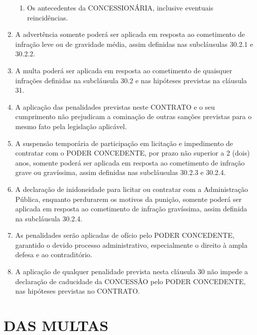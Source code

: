 \documentclass[a4paper,11pt]{report} %
\begin{document}
\begin{enumerate}
\begin{enumerate}[label*=\arabic*.]
\item \label{itm:CPNZ} Os antecedentes da CONCESSIONÁRIA, inclusive eventuais reincidências.
\end{enumerate}

\item \label{itm:F7F3} A advertência somente poderá ser aplicada em resposta ao cometimento de infração leve ou de gravidade média, assim definidas nas subcláusulas 30.2.1 e 30.2.2.

\item \label{itm:M4G4} A multa poderá ser aplicada em resposta ao cometimento de quaisquer infrações definidas na subcláusula 30.2 e nas hipóteses previstas na cláusula 31.

\item \label{itm:PTRL} A aplicação das penalidades previstas neste CONTRATO e o seu cumprimento não prejudicam a cominação de outras sanções previstas para o mesmo fato pela legislação aplicável.

\item \label{itm:AXZA} A suspensão temporária de participação em licitação e impedimento de contratar com o PODER CONCEDENTE, por prazo não superior a 2 (dois) anos, somente poderá ser aplicada em resposta ao cometimento de infração grave ou gravíssima, assim definidas nas subcláusulas 30.2.3 e 30.2.4.

\item \label{itm:GFXR} A declaração de inidoneidade para licitar ou contratar com a Administração Pública, enquanto perdurarem os motivos da punição, somente poderá ser aplicada em resposta ao cometimento de infração gravíssima, assim definida na subcláusula 30.2.4.

\item \label{itm:TGC2} As penalidades serão aplicadas de ofício pelo PODER CONCEDENTE, garantido o devido processo administrativo, especialmente o direito à ampla defesa e ao contraditório.

\item \label{itm:WGQL} A aplicação de qualquer penalidade prevista nesta cláusula 30 não impede a declaração de caducidade da CONCESSÃO pelo PODER CONCEDENTE, nas hipóteses previstas no CONTRATO.
\end{enumerate}

\section{DAS MULTAS}
\label{sec:FXH5}
\end{document}
